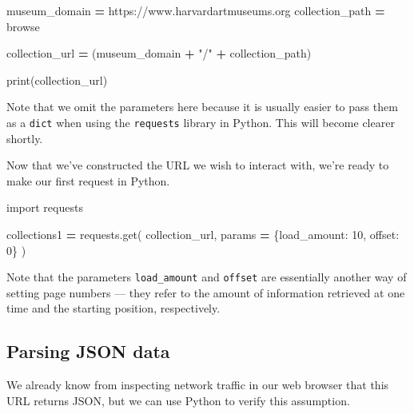 \documentclass[
]{book}
\newenvironment{Shaded}{\begin{snugshade}}{\end{snugshade}}
\newcommand{\BuiltInTok}[1]{#1}
\newcommand{\DecValTok}[1]{\textcolor[rgb]{0.00,0.00,0.81}{#1}}
\newcommand{\ImportTok}[1]{#1}
\newcommand{\NormalTok}[1]{#1}
\newcommand{\OperatorTok}[1]{\textcolor[rgb]{0.81,0.36,0.00}{\textbf{#1}}}
\newcommand{\StringTok}[1]{\textcolor[rgb]{0.31,0.60,0.02}{#1}}
\begin{document}
\begin{Shaded}
\begin{Highlighting}[]
\NormalTok{museum\_domain }\OperatorTok{=} \StringTok{\textquotesingle{}https://www.harvardartmuseums.org\textquotesingle{}}
\NormalTok{collection\_path }\OperatorTok{=} \StringTok{\textquotesingle{}browse\textquotesingle{}}

\NormalTok{collection\_url }\OperatorTok{=}\NormalTok{ (museum\_domain}
                  \OperatorTok{+} \StringTok{"/"}
                  \OperatorTok{+}\NormalTok{ collection\_path)}

\BuiltInTok{print}\NormalTok{(collection\_url)}
\end{Highlighting}
\end{Shaded}

Note that we omit the parameters here because it is usually easier to pass them as a \texttt{dict} when using the \texttt{requests} library in Python. This will become clearer shortly.

Now that we've constructed the URL we wish to interact with, we're ready to make our first request in Python.

\begin{Shaded}
\begin{Highlighting}[]
\ImportTok{import}\NormalTok{ requests}

\NormalTok{collections1 }\OperatorTok{=}\NormalTok{ requests.get(}
\NormalTok{    collection\_url,}
\NormalTok{    params }\OperatorTok{=}\NormalTok{ \{}\StringTok{\textquotesingle{}load\_amount\textquotesingle{}}\NormalTok{: }\DecValTok{10}\NormalTok{,}
                  \StringTok{\textquotesingle{}offset\textquotesingle{}}\NormalTok{: }\DecValTok{0}\NormalTok{\}}
\NormalTok{)}
\end{Highlighting}
\end{Shaded}

Note that the parameters \texttt{load\_amount} and \texttt{offset} are essentially another way of setting page numbers --- they refer to the amount of information retrieved at one time and the starting position, respectively.

\hypertarget{parsing-json-data}{%
\subsection{Parsing JSON data}\label{parsing-json-data}}

We already know from inspecting network traffic in our web browser that this URL returns JSON, but we can use Python to verify this assumption.
\end{document}
